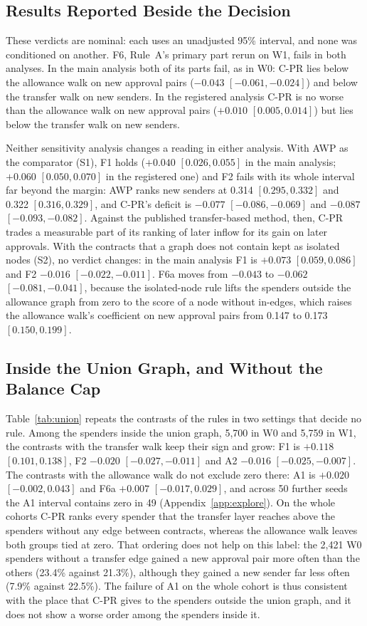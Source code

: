 \documentclass{ieeeaccess}
\newcommand{\cpr}{\mbox{C-PR}}
\begin{document}
\subsection{Results Reported Beside the Decision}
These verdicts are nominal: each uses an unadjusted 95\% interval, and none was conditioned on another. F6, Rule~A's primary part rerun on W1, fails in both analyses. In the main analysis both of its parts fail, as in W0: \cpr{} lies below the allowance walk on new approval pairs ($-0.043$ $[-0.061,-0.024]$) and below the transfer walk on new senders. In the registered analysis \cpr{} is no worse than the allowance walk on new approval pairs ($+0.010$ $[0.005,0.014]$) but lies below the transfer walk on new senders.

Neither sensitivity analysis changes a reading in either analysis. With AWP as the comparator (S1), F1 holds ($+0.040$ $[0.026,0.055]$ in the main analysis; $+0.060$ $[0.050,0.070]$ in the registered one) and F2 fails with its whole interval far beyond the margin: AWP ranks new senders at 0.314 $[0.295,0.332]$ and 0.322 $[0.316,0.329]$, and \cpr{}'s deficit is $-0.077$ $[-0.086,-0.069]$ and $-0.087$ $[-0.093,-0.082]$. Against the published transfer-based method, then, \cpr{} trades a measurable part of its ranking of later inflow for its gain on later approvals. With the contracts that a graph does not contain kept as isolated nodes (S2), no verdict changes: in the main analysis F1 is $+0.073$ $[0.059,0.086]$ and F2 $-0.016$ $[-0.022,-0.011]$. F6a moves from $-0.043$ to $-0.062$ $[-0.081,-0.041]$, because the isolated-node rule lifts the spenders outside the allowance graph from zero to the score of a node without in-edges, which raises the allowance walk's coefficient on new approval pairs from 0.147 to 0.173 $[0.150,0.199]$.

\subsection{Inside the Union Graph, and Without the Balance Cap}
\label{sec:union}
Table~\ref{tab:union} repeats the contrasts of the rules in two settings that decide no rule. Among the spenders inside the union graph, 5,700 in W0 and 5,759 in W1, the contrasts with the transfer walk keep their sign and grow: F1 is $+0.118$ $[0.101,0.138]$, F2 $-0.020$ $[-0.027,-0.011]$ and A2 $-0.016$ $[-0.025,-0.007]$. The contrasts with the allowance walk do not exclude zero there: A1 is $+0.020$ $[-0.002,0.043]$ and F6a $+0.007$ $[-0.017,0.029]$, and across 50 further seeds the A1 interval contains zero in 49 (Appendix~\ref{app:explore}). On the whole cohorts \cpr{} ranks every spender that the transfer layer reaches above the spenders without any edge between contracts, whereas the allowance walk leaves both groups tied at zero. That ordering does not help on this label: the 2,421 W0 spenders without a transfer edge gained a new approval pair more often than the others (23.4\% against 21.3\%), although they gained a new sender far less often (7.9\% against 22.5\%). The failure of A1 on the whole cohort is thus consistent with the place that \cpr{} gives to the spenders outside the union graph, and it does not show a worse order among the spenders inside it.
\end{document}
